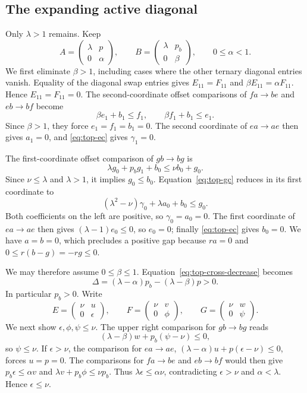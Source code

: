 \documentclass[11pt,a4paper]{article}
\begin{document}
\subsection{The expanding active diagonal}

Only $\lambda>1$ remains. Keep
\[
A=\begin{pmatrix}\lambda&p\\0&\alpha\end{pmatrix},\qquad
B=\begin{pmatrix}\lambda&p_b\\0&\beta\end{pmatrix},
\qquad 0\le\alpha<1.
\]
We first eliminate $\beta>1$, including cases where the other
ternary diagonal entries vanish. Equality of the diagonal swap entries
gives $E_{11}=F_{11}$ and
$\beta E_{11}=\alpha F_{11}$. Hence $E_{11}=F_{11}=0$.
The second-coordinate offset comparisons of $fa\to be$ and
$eb\to bf$ become
\[
\beta e_1+b_1\le f_1,\qquad
\beta f_1+b_1\le e_1.
\]
Since $\beta>1$, they force $e_1=f_1=b_1=0$.
The second coordinate of $ea\to ae$ then gives $a_1=0$,
and \eqref{eq:top-ec} gives $\gamma_1=0$.

The first-coordinate offset comparison of $gb\to bg$ is
\[
\lambda g_0+p_bg_1+b_0\le\nu b_0+g_0.
\]
Since $\nu\le\lambda$ and $\lambda>1$, it implies $g_0\le b_0$.
Equation~\eqref{eq:top-gc} reduces in its first coordinate to
\[
(\lambda^2-\nu)\gamma_0+\lambda a_0+b_0\le g_0.
\]
Both coefficients on the left are positive, so
$\gamma_0=a_0=0$. The first coordinate of $ea\to ae$ then gives
$(\lambda-1)e_0\le0$, so $e_0=0$; finally
\eqref{eq:top-ec} gives $b_0=0$.
We have $a=b=0$, which precludes a positive gap because
$ra=0$ and $0\le r(b-g)=-rg\le0$.

We may therefore assume $0\le\beta\le1$.
Equation~\eqref{eq:top-cross-decrease} becomes
\begin{equation}\label{eq:top-delta}
\Delta=(\lambda-\alpha)p_b-(\lambda-\beta)p>0.
\end{equation}
In particular $p_b>0$. Write
\[
E=\begin{pmatrix}\nu&u\\0&\epsilon\end{pmatrix},\qquad
F=\begin{pmatrix}\nu&v\\0&\phi\end{pmatrix},\qquad
G=\begin{pmatrix}\nu&w\\0&\psi\end{pmatrix}.
\]
We next show $\epsilon,\phi,\psi\le\nu$. The upper right
comparison for $gb\to bg$ reads
\[
(\lambda-\beta)w+p_b(\psi-\nu)\le0,
\]
so $\psi\le\nu$. If $\epsilon>\nu$, the comparison for
$ea\to ae$,
$(\lambda-\alpha)u+p(\epsilon-\nu)\le0$, forces $u=p=0$.
The comparisons for $fa\to be$ and $eb\to bf$ would then give
$p_b\epsilon\le\alpha v$ and
$\lambda v+p_b\phi\le\nu p_b$. Thus
$\lambda\epsilon\le\alpha\nu$, contradicting
$\epsilon>\nu$ and $\alpha<\lambda$.
Hence $\epsilon\le\nu$.
\end{document}
